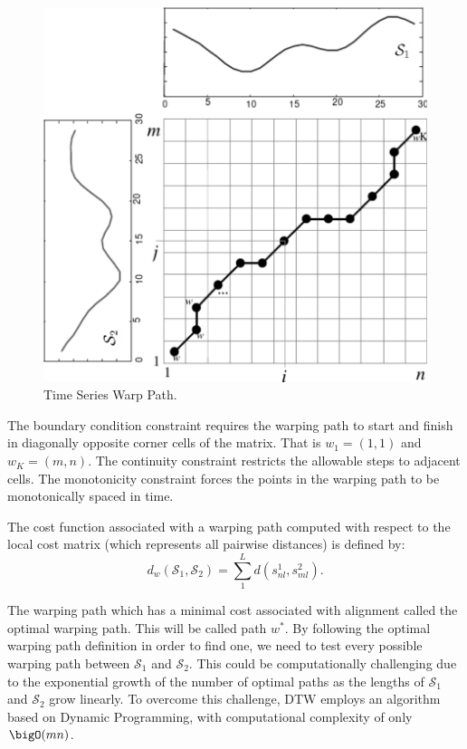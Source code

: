 \begin{figure}[htb]
	\centering
	\includegraphics[scale=0.5]{../Figures/DTW-WarpPath}
	\caption{Time Series Warp Path.}
	\label{Fig:DTW_warp_path}
\end{figure}

The boundary condition constraint requires the warping path to start and finish in diagonally opposite corner cells of the matrix. That is $w_{1} = (1, 1)$ and $w_{K} = (m, n)$. The continuity constraint restricts the allowable steps to adjacent cells. The monotonicity constraint forces the points in the warping path to be monotonically spaced in time. 

The cost function associated with a warping path computed with respect to the local cost matrix (which represents all pairwise distances) is defined by: 
\begin{equation}
    d_{w}\left(\mathcal{S}_{1}, \mathcal{S}_{2}\right) = \sum_{1}^{L} d(s^{1}_{nl}, s^{2}_{ml}).
\end{equation}

The warping path which has a minimal cost associated with alignment called the optimal warping path.  This will be called path $w^{*}$. By following the optimal warping path definition in order to find one, we need to test every possible warping path between $\mathcal{S}_{1}$ and $\mathcal{S}_{2}$. This could be computationally challenging due to the exponential growth of the number of optimal paths as the lengths of $\mathcal{S}_{1}$ and $\mathcal{S}_{2}$ grow linearly. To overcome this challenge, DTW employs an algorithm based on Dynamic Programming, with computational complexity of only $\bigO(mn)$.

